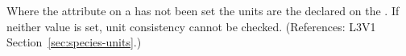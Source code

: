 Where the  attribute on a \Species has 
not been set the units
are the  declared on the \Model.  If neither
value is set, unit consistency cannot be checked.  (References: 
L3V1 Section~\ref{sec:species-units}.)
